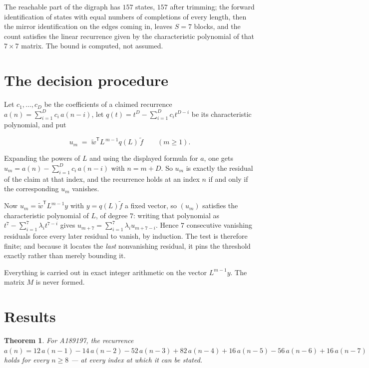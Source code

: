 \documentclass[11pt]{article}
\newtheorem{theorem}{Theorem}
\theoremstyle{definition}
\begin{document}
The reachable part of the digraph has $157$ states, $157$ after trimming; the forward identification of states with equal numbers of completions of every length, then the mirror identification on the edges coming in, leaves $S = 7$ blocks, and the count satisfies the linear recurrence given by the characteristic polynomial of that $7\times7$ matrix. The bound is computed, not assumed.

\section{The decision procedure}

Let $c_1,\dots,c_D$ be the coefficients of a claimed recurrence $a(n) = \sum_{i=1}^{D} c_i\,a(n-i)$, let $q(t) = t^{D} - \sum_{i=1}^{D} c_i t^{D-i}$ be its characteristic polynomial, and put

\[u_m \;=\; \tilde w^{\mathsf T} L^{\,m-1} q(L)\,\tilde f \qquad (m \ge 1).\]

Expanding the powers of $L$ and using the displayed formula for $a$, one gets $u_m = a(n) - \sum_{i=1}^{D} c_i\,a(n-i)$ with $n = m + D$. So $u_m$ is exactly the residual of the claim at that index, and the recurrence holds at an index $n$ if and only if the corresponding $u_m$ vanishes.

Now $u_m = \tilde w^{\mathsf T} L^{m-1} y$ with $y = q(L)\tilde f$ a fixed vector, so $(u_m)$ satisfies the characteristic polynomial of $L$, of degree $7$: writing that polynomial as $t^{7} - \sum_{i=1}^{7} \lambda_i t^{7-i}$ gives $u_{m+7} = \sum_{i=1}^{7} \lambda_i u_{m+7-i}$. Hence $7$ consecutive vanishing residuals force every later residual to vanish, by induction. The test is therefore finite; and because it locates the {\itshape last} nonvanishing residual, it pins the threshold exactly rather than merely bounding it.

Everything is carried out in exact integer arithmetic on the vector $L^{m-1}y$. The matrix $M$ is never formed.

\section{Results}

\begin{theorem} For A189197, the recurrence $a(n) = 12\,a(n-1) - 14\,a(n-2) - 52\,a(n-3) + 82\,a(n-4) + 16\,a(n-5) - 56\,a(n-6) + 16\,a(n-7)$ holds for every $n \ge 8$ --- at every index at which it can be stated.\end{theorem}
\end{document}
